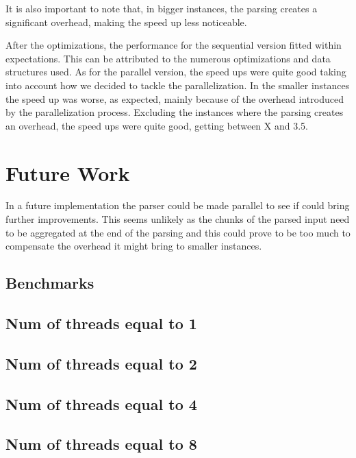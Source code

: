 \documentclass[a4paper]{article}
\begin{document}
It is also important to note that, in bigger instances, the parsing creates a
significant overhead, making the speed up less noticeable.

After the optimizations, the performance for the sequential version fitted
within expectations. This can be attributed to the numerous optimizations and
data structures used.  As for the parallel version, the speed ups were quite good
taking into account how we decided to tackle the parallelization. In the smaller
instances the speed up was worse, as expected, mainly because of the overhead
introduced by the parallelization process. Excluding the instances where the
parsing creates an overhead, the speed ups were quite good, getting between X
and 3.5.

\section{Future Work}
In a future implementation the parser could be made parallel to see if could
bring further improvements. This seems unlikely as the chunks of the parsed
input need to be aggregated at the end of the parsing and this could prove to be
too much to compensate the overhead it might bring to smaller instances.

\begin{appendices}
    \section{Benchmarks}

    \subsection{Num of threads equal to 1}

    

    \subsection{Num of threads equal to 2}

    

    \subsection{Num of threads equal to 4}

    

    \subsection{Num of threads equal to 8}

    
\end{appendices}

\end{document}
